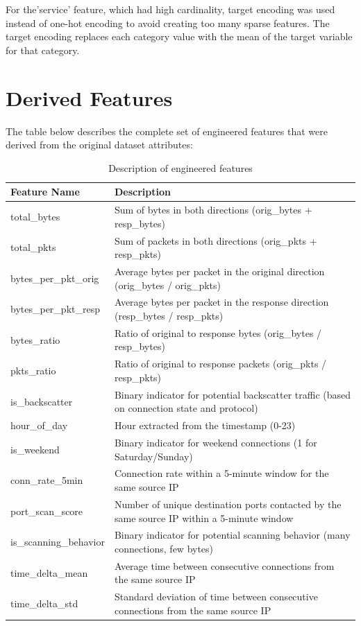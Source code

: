 For the'service' feature, which had high cardinality, target encoding was used instead of one-hot encoding to avoid creating too many sparse features. The target encoding replaces each category value with the mean of the target variable for that category.

\section{Derived Features}

The table below describes the complete set of engineered features that were derived from the original dataset attributes:

\begin{table}[h]
\centering
\caption{Description of engineered features}
\label{tab:engineered_features}
\begin{tabular}{lp{10cm}}
\hline
\textbf{Feature Name} & \textbf{Description} \\
\hline
total\_bytes & Sum of bytes in both directions (orig\_bytes + resp\_bytes) \\
total\_pkts & Sum of packets in both directions (orig\_pkts + resp\_pkts) \\
bytes\_per\_pkt\_orig & Average bytes per packet in the original direction (orig\_bytes / orig\_pkts) \\
bytes\_per\_pkt\_resp & Average bytes per packet in the response direction (resp\_bytes / resp\_pkts) \\
bytes\_ratio & Ratio of original to response bytes (orig\_bytes / resp\_bytes) \\
pkts\_ratio & Ratio of original to response packets (orig\_pkts / resp\_pkts) \\
is\_backscatter & Binary indicator for potential backscatter traffic (based on connection state and protocol) \\
hour\_of\_day & Hour extracted from the timestamp (0-23) \\
is\_weekend & Binary indicator for weekend connections (1 for Saturday/Sunday) \\
conn\_rate\_5min & Connection rate within a 5-minute window for the same source IP \\
port\_scan\_score & Number of unique destination ports contacted by the same source IP within a 5-minute window \\
is\_scanning\_behavior & Binary indicator for potential scanning behavior (many connections, few bytes) \\
time\_delta\_mean & Average time between consecutive connections from the same source IP \\
time\_delta\_std & Standard deviation of time between consecutive connections from the same source IP \\
\hline
\end{tabular}
\end{table}

